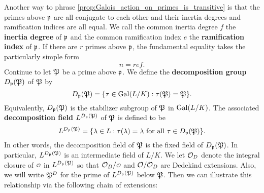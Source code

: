     Another way to phrase \cref{prop:Galois_action_on_primes_is_transitive} is that the primes above $\mathfrak{p}$ are all conjugate to each other and their inertia degrees and ramification indices are all equal. We call the common inertia degree $f$ the \textbf{inertia degree} of $\mathfrak{p}$ and the common ramification index $e$ the \textbf{ramification index} of $\mathfrak{p}$. If there are $r$ primes above $\mathfrak{p}$, the fundamental equality takes the particularly simple form
    \[
      n = ref.
    \]
    Continue to let $\mathfrak{P}$ be a prime above $\mathfrak{p}$. We define the \textbf{decomposition group} $D_{\mathfrak{p}}(\mathfrak{P})$ of $\mathfrak{P}$ by
    \[
      D_{\mathfrak{p}}(\mathfrak{P}) = \{\tau \in \operatorname{\mathrm{Gal}}(L/K):\tau(\mathfrak{P}) = \mathfrak{P}\}.
    \]
    Equivalently, $D_{\mathfrak{p}}(\mathfrak{P})$ is the stabilizer subgroup of $\mathfrak{P}$ in $\operatorname{\mathrm{Gal}}(L/K)$. The associated \textbf{decomposition field} $L^{D_{\mathfrak{p}}(\mathfrak{P})}$ of $\mathfrak{P}$ is defined to be
    \[
      L^{D_{\mathfrak{p}}(\mathfrak{P})} = \{\lambda \in L:\text{$\tau(\lambda) = \lambda$ for all $\tau \in D_{\mathfrak{p}}(\mathfrak{P})$}\}.
    \]
    In other words, the decomposition field of $\mathfrak{P}$ is the fixed field of $D_{\mathfrak{p}}(\mathfrak{P})$. In particular, $L^{D_{\mathfrak{p}}(\mathfrak{P})}$ is an intermediate field of $L/K$. We let $\mathcal{O}_{D}$ denote the integral closure of $\smc{O}$ in $L^{D_{\mathfrak{p}}(\mathfrak{P})}$ so that $\mc{O}_{D}/\smc{O}$ and $\mathcal{O}/\mathcal{O}_{D}$ are Dedekind extensions. Also, we will write $\mathfrak{P}^{D}$ for the prime of $L^{D_{\mathfrak{p}}(\mathfrak{P})}$ below $\mathfrak{P}$. Then we can illustrate this relationship via the following chain of extensions:
    
    \begin{center}
    \end{center}

